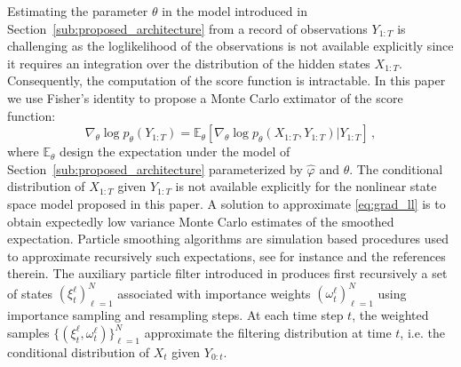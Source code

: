 \documentclass{article}
\begin{document}
Estimating the parameter $\theta$ in the model introduced in Section~\ref{sub:proposed_architecture} from a record of observations $Y_{1:T}$ is challenging as the loglikelihood of the observations is not available explicitly since  it requires an integration over the distribution of the hidden states $X_{1:T}$. Consequently, the computation of the score function is intractable.
In this paper we use Fisher's identity to propose a Monte Carlo extimator of the score function:
\begin{equation}
	\nabla_\theta \log p_\theta(Y_{1:T}) = \mathbb{E}_\theta \left[ \nabla_\theta\log p_\theta(X_{1:T}, Y_{1:T}) | Y_{1:T} \right]\,,
	\label{eq:grad_ll}
\end{equation}
where $\mathbb{E}_\theta$ design the expectation under the model of Section~\ref{sub:proposed_architecture} parameterized by $\widehat \varphi$ and $\theta$. The conditional distribution of $X_{1:T}$ given $Y_{1:T}$ is not available explicitly for the nonlinear state space model proposed in this paper. A solution to approximate \eqref{eq:grad_ll} is to obtain expectedly low variance Monte Carlo estimates of the smoothed expectation.
Particle smoothing algorithms are simulation based procedures used to approximate recursively such expectations, see for instance \cite{} and the references therein.
 The auxiliary particle filter introduced in \cite{} produces first recursively a set of states $(\xi^{\ell}_t)_{\ell=1}^N$ associated with importance weights $(\omega^{\ell}_t)_{\ell=1}^N$ using importance sampling and resampling steps. At each time step $t$, the weighted samples $\{(\xi^{\ell}_t,\omega^{\ell}_t)\}_{\ell=1}^N$ approximate the filtering distribution at time $t$, i.e. the conditional distribution of $X_t$ given $Y_{0:t}$. %
\end{document}
